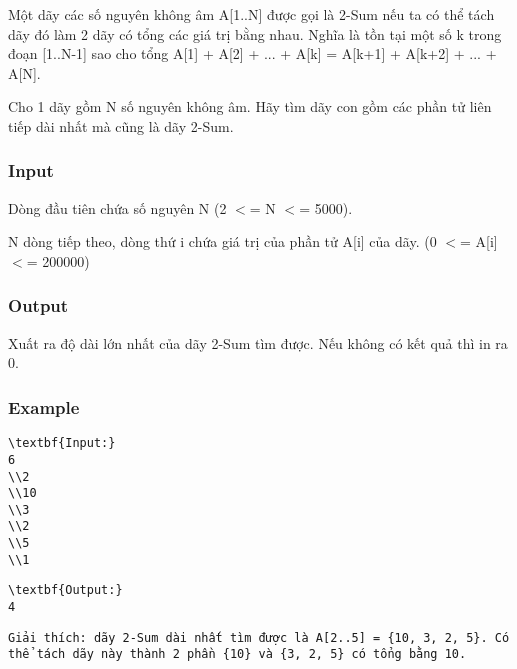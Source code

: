



   Một dãy các số nguyên không âm A[1..N] được gọi là 2-Sum nếu ta có thể tách dãy đó làm 2 dãy có tổng các giá trị bằng nhau. Nghĩa là tồn tại một số k trong đoạn [1..N-1] sao cho tổng A[1] + A[2] + ... + A[k] = A[k+1] + A[k+2] + ... + A[N].  

   Cho 1 dãy gồm N số nguyên không âm. Hãy tìm dãy con gồm các phần tử liên tiếp dài nhất mà cũng là dãy 2-Sum.  

\subsubsection{   Input  }

   Dòng đầu tiên chứa số nguyên N (2 $<$= N $<$= 5000).  

   N dòng tiếp theo, dòng thứ i chứa giá trị của phần tử A[i] của dãy. (0 $<$= A[i] $<$= 200000)  

\subsubsection{   Output  }

   Xuất ra độ dài lớn nhất của dãy 2-Sum tìm được. Nếu không có kết quả thì in ra 0.  

\subsubsection{   Example  }
\begin{verbatim}
\textbf{Input:}
6
\\2
\\10
\\3
\\2
\\5
\\1 \end{verbatim}
\begin{verbatim}
\textbf{Output:}
4\end{verbatim}
\begin{verbatim}
Giải thích: dãy 2-Sum dài nhất tìm được là A[2..5] = {10, 3, 2, 5}. Có thể tách dãy này thành 2 phần {10} và {3, 2, 5} có tổng bằng 10.\end{verbatim}